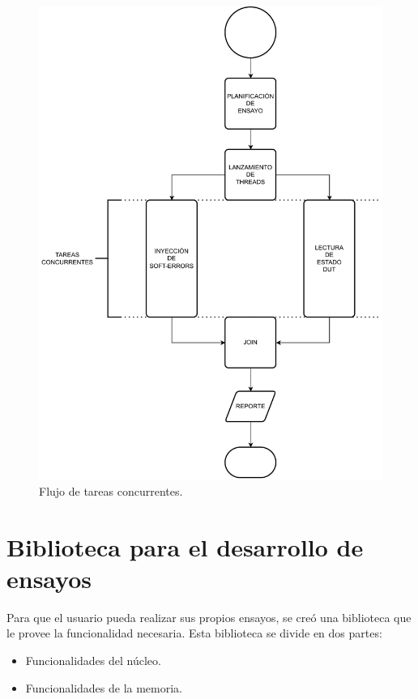 \begin{figure}[htbp]
	\centering
	\includegraphics[width=\textwidth]{./Figures/concurrencia.pdf}
    \caption{Flujo de tareas concurrentes.}
	\label{fig:concurrencia}
\end{figure}

\section{Biblioteca para el desarrollo de ensayos}
\label{fig:biblioteca}

Para que el usuario pueda realizar sus propios ensayos, se creó una biblioteca que le provee la funcionalidad necesaria.
Esta biblioteca se divide en dos partes:

\begin{itemize}
    \item Funcionalidades del núcleo.
    \item Funcionalidades de la memoria.
\end{itemize}


